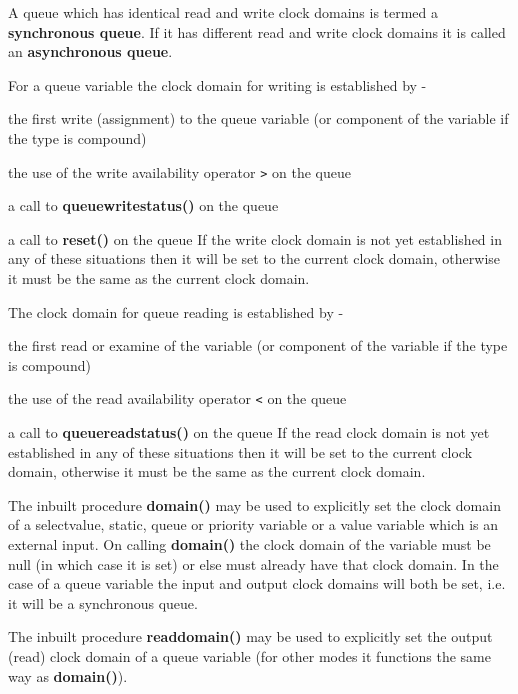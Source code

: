             A queue which has identical read and write clock domains is termed
            a {\bf synchronous queue}. If it has different read and write
            clock domains it is called an {\bf asynchronous queue}.

            For a queue variable the clock domain for writing is established by -
            \blist
            \item   the first write (assignment) to the queue variable (or
                    component of the variable if the type is compound)
            \item   the use of the write availability operator \verb'>' on the queue
            \item   a call to {\bf queuewritestatus()} on the queue
            \item   a call to {\bf reset()} on the queue
            \blend
            If the write clock domain is not yet established in any of these
            situations then it will be set to the current clock domain,
            otherwise it must be the same as the current clock domain.

            The clock domain for queue reading is established by -
            \blist
            \item   the first read or examine of the variable (or component of
                    the variable if the type is compound)
            \item   the use of the read availability operator \verb'<' on the queue
            \item   a call to {\bf queuereadstatus()} on the queue
            \blend
            If the read clock domain is not yet established in any of these
            situations then it will be set to the current clock domain,
            otherwise it must be the same as the current clock domain.
        
            The inbuilt procedure {\bf domain()} may be used to explicitly set
            the clock domain of a selectvalue, static, queue or priority variable
            or a value variable which is an external input. On calling {\bf
            domain()} the clock domain of the variable must be null (in which
            case it is set) or else must already have that clock domain. In the
            case of a queue variable the input and output clock domains will both
            be set, i.e. it will be a synchronous queue.
            
            The inbuilt procedure {\bf readdomain()} may be used to explicitly
            set the output (read) clock domain of a queue variable (for other
            modes it functions the same way as {\bf domain()}).
            
